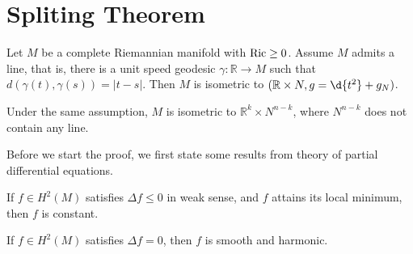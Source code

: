 \section{Spliting Theorem}

\begin{thm}\label{Cheeger Gromoll}
    Let $M$ be a complete Riemannian manifold with $\operatorname{Ric}\geq 0$.
    Assume $M$ admits a line, that is, there is a unit speed geodesic $\gamma:\mathbb{R}\to M$ such that $d(\gamma(t),\gamma(s))=|t-s|$.
    Then $M$ is isometric to $(\mathbb{R}\times N,g=\d{t^2}+g_N)$.
\end{thm}

\begin{cor}
    Under the same assumption, $M$ is isometric to $\mathbb{R}^k\times N^{n-k}$, where $N^{n-k}$ does not contain any line.
\end{cor}

Before we start the proof, we first state some results from theory of partial differential equations.
\begin{thm}
    If $f\in H^2(M)$ satisfies $\Delta f\leq 0$ in weak sense, and $f$ attains its local minimum, then $f$ is constant.
\end{thm}

\begin{thm}
    If $f\in H^2(M)$ satisfies $\Delta f=0$, then $f$ is smooth and harmonic.
\end{thm}

